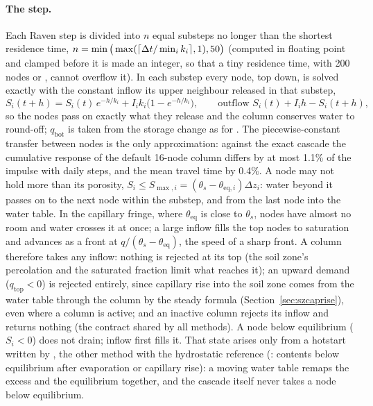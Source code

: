 \paragraph{The step.} Each Raven step is divided into $n$ equal substeps no longer than the shortest residence time,
$n=\min\big(\max(\lceil\Delta t/\min_ik_i\rceil,1),50\big)$ (computed in floating point and clamped before it is made an
integer, so that a tiny residence time, with 200 nodes or , cannot overflow it). In
each substep every node, top down, is solved exactly with the constant inflow its upper neighbour released in that
substep,
\begin{equation}
S_i(t+h)=S_i(t)\,e^{-h/k_i}+I_ik_i\big(1-e^{-h/k_i}\big),\qquad \text{outflow } S_i(t)+I_ih-S_i(t+h),
\end{equation}
so the nodes pass on exactly what they release and the column conserves water to round-off; $q_{\mathrm{bot}}$ is taken
from the storage change as for . The piecewise-constant transfer between nodes is the only approximation:
against the exact cascade the cumulative response of the default 16-node column differs by at most 1.1\% of the
impulse with daily steps, and the mean travel time by 0.4\%.
A node may not hold more than its porosity, $S_i\le S_{\max,i}=(\theta_s-\theta_{\mathrm{eq},i})\Delta z_i$: water beyond
it passes on to the next node within the substep, and from the last node into the water table. In the capillary
fringe, where $\theta_{\mathrm{eq}}$ is close to $\theta_s$, nodes have almost no room and water crosses it at once; a
large inflow fills the top nodes to saturation and advances as a front at $q/(\theta_s-\theta_{\mathrm{eq}})$, the speed
of a sharp front. A column therefore takes any inflow: nothing is rejected at its top (the soil zone's percolation and
the saturated fraction limit what reaches it); an upward demand ($q_{\mathrm{top}}<0$) is rejected entirely, since
capillary rise into the soil zone comes from the water table through the column by the steady formula
(Section~\ref{sec:szcaprise}), even where a column is active; and an inactive column rejects its inflow and returns
nothing (the contract shared by all methods). A node below equilibrium ($S_i<0$) does not drain; inflow first fills
it. That state arises only from a hotstart written by , the other method with the hydrostatic reference
(: contents below equilibrium after evaporation or capillary rise): a moving water table remaps the excess and the
equilibrium together, and the cascade itself never takes a node below equilibrium.


